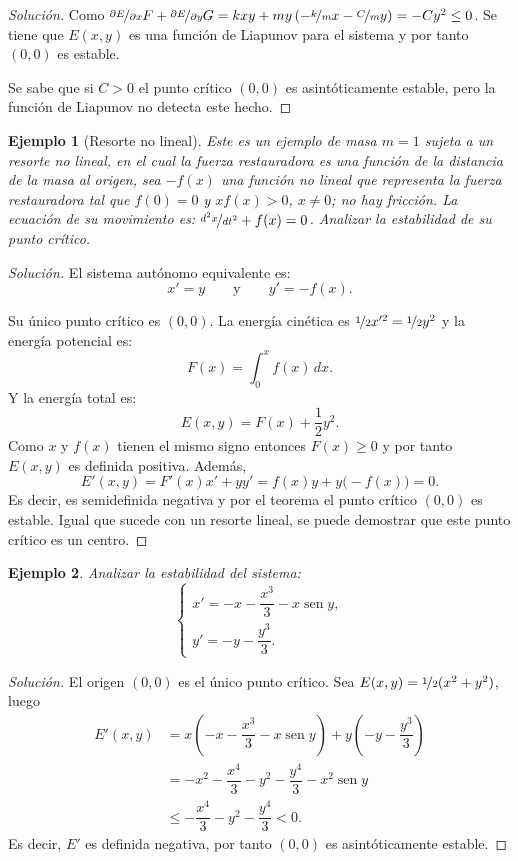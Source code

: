 \documentclass[a5paper,doc,10pt,noapacite]{apa6}
\newcommand{\yds}{\qquad\text{y}\qquad}
\DeclareMathOperator{\sen}{sen}
\newtheorem{ejem}{Ejemplo}
\begin{document}
{{\begin{proof}[Solución]
		Como \(\nicefrac{\partial E}{\partial x}F+\nicefrac{\partial E}{\partial y}G=kxy+my\left(-\nicefrac{k}{m}x-\nicefrac{C}{m}y\right)=-Cy^2\leq 0\). Se tiene que \(E(x,y)\) es una función de Liapunov para el sistema y por tanto \((0,0)\) es estable.
		
		Se sabe que si \(C>0\) el punto crítico \((0,0)\) es asintóticamente estable, pero la función de Liapunov no detecta este hecho.
\end{proof}

\begin{ejem}[Resorte no lineal]
	Este es un ejemplo de masa \(m=1\) sujeta a un resorte no lineal, en el cual la fuerza restauradora es una función de la distancia de la masa al origen, sea \(-f(x)\) una función no lineal que representa la fuerza restauradora tal que \(f(0)=0\) y \(xf(x)>0\), \(x\neq 0\); no hay fricción. La ecuación de su movimiento es: \(\nicefrac{d^2x}{dt^2}+f(x)=0\). Analizar la estabilidad de su punto crítico.
\end{ejem}
\begin{proof}[Solución]
		El sistema autónomo equivalente es: 
		\[
			x'=y \yds y'=-f(x).
		\]
		
		Su único punto crítico es \((0,0)\). La energía cinética es \(\nicefrac{1}{2}x'^2=\nicefrac{1}{2}y^2\) y la energía potencial es: 
		\[
		F(x)=\displaystyle\int_{0}^{x}f(x)\,dx.
		\]
		Y la energía total es:
		\[
		E(x,y)=F(x)+\dfrac{1}{2}y^2.
		\]
		Como \(x\) y \(f(x)\) tienen el mismo signo entonces \(F(x)\geq0\) y por tanto \(E(x,y)\) es definida positiva. Además,
		\[
		E'(x,y)=F'(x)x'+yy'=f(x)y+y\big(-f(x)\big)=0.
		\]
		Es decir, es semidefinida negativa y por el teorema el punto crítico \((0,0)\) es estable. Igual que sucede con un resorte lineal, se puede demostrar que este punto crítico es un centro.
\end{proof}


\begin{ejem}
	Analizar la estabilidad del sistema:
	\[
	\begin{cases}
		x'=-x-\dfrac{x^3}{3}-x\sen y,
		\\
		y'=-y-\dfrac{y^3}{3}.
	\end{cases}
	\]
\end{ejem}
	\begin{proof}[Solución]
		El origen \((0,0)\) es el único punto crítico. Sea \(E(x,y)=\nicefrac{1}{2}(x^2+y^2)\), luego
		\begin{align*}
			E'(x,y)&=x\left(-x-\dfrac{x^3}{3}-x\sen y\right)+y\left(-y-\dfrac{y^3}{3}\right)\\
				&=-x^2-\dfrac{x^4}{3}-y^2-\dfrac{y^4}{3}-x^2\sen y\\
				&\leq -\dfrac{x^4}{3}-y^2-\dfrac{y^4}{3}<0.
		\end{align*}
		Es decir, \(E'\) es definida negativa, por tanto \((0,0)\) es asintóticamente estable.
	\end{proof}


}}
\end{document}

